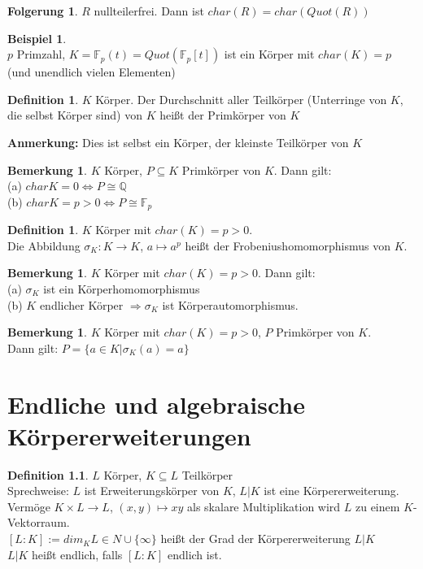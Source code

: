 \documentclass[10pt,a4paper,numbers=endperiod]{scrreprt}
\theoremstyle{definition}
\newtheorem{defi}[satz]{Definition}
\newtheorem{bem}[satz]{Bemerkung}
\newtheorem{bsp}[satz]{Beispiel}
\newtheorem{folg}[satz]{Folgerung}
\def\QQ{{\mathbb Q}}
\def\FF{{\mathbb F}}
\begin{document}
\begin{folg}
	$R$ nullteilerfrei. Dann ist $char(R) = char(Quot(R))$
\end{folg}

\begin{bsp}
	$ $\\
	$p$ Primzahl, $K = \FF_p(t) = Quot(\FF_p[t])$ ist ein Körper mit $char(K) = p$ (und unendlich vielen Elementen)
\end{bsp}

\begin{defi}
	$K$ Körper. Der Durchschnitt aller Teilkörper (Unterringe von $K$, die selbst Körper sind) von $K$ heißt der Primkörper von $K$
\end{defi}

\textbf{Anmerkung:} Dies ist selbst ein Körper, der kleinste Teilkörper von $K$

\begin{bem}
	$K$ Körper, $P \subseteq K$ Primkörper von $K$. Dann gilt:\\
	(a) $char K = 0 \Leftrightarrow P \cong \QQ$\\
	(b) $char K = p > 0 \Leftrightarrow P \cong \FF_p$
\end{bem}

\begin{defi}
	$K$ Körper mit $char(K) = p > 0$.\\
	Die Abbildung $\sigma_K: K \rightarrow K$, $a \mapsto a^p$ heißt der Frobeniushomomorphismus von $K$.
\end{defi}

\begin{bem}
	$K$ Körper mit $char(K) = p > 0$. Dann gilt:\\
	(a) $\sigma_K$ ist ein Körperhomomorphismus\\
	(b) $K$ endlicher Körper $\Rightarrow \sigma_K$ ist Körperautomorphismus.
\end{bem}

\begin{bem}
	$K$ Körper mit $char(K) = p > 0$, $P$ Primkörper von $K$.\\
	Dann gilt: $P = \{a \in K| \sigma_K(a) = a\}$
\end{bem}

\chapter{Endliche und algebraische Körpererweiterungen}

\begin{defi}
	$L$ Körper, $K \subseteq L$ Teilkörper\\
	Sprechweise: $L$ ist Erweiterungskörper von $K$, $L|K$ ist eine Körpererweiterung.\\
	Vermöge $K \times L \rightarrow L$, $(x,y) \mapsto xy$ als skalare Multiplikation wird $L$ zu einem $K$-Vektorraum.\\
	$[L:K] := dim_K L \in N \cup \{\infty\}$ heißt der Grad der Körpererweiterung $L|K$\\
	$L|K$ heißt endlich, falls $[L:K]$ endlich ist.
\end{defi}
	
\end{document}
